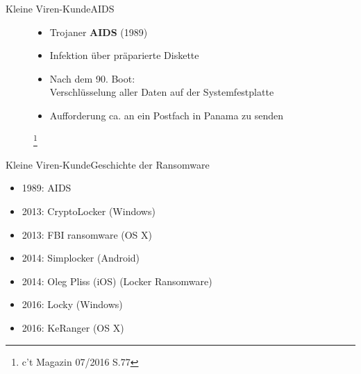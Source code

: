 \documentclass[notes,10pt]{beamer}
\begin{document}
\begin{frame}{Kleine Viren-Kunde}{AIDS}
	\begin{figure}[p]
		\begin{itemize}
			\item Trojaner \textbf{AIDS} (1989)
			\item Infektion über präparierte Diskette
			\item Nach dem 90. Boot: \\ Verschlüsselung aller Daten auf der Systemfestplatte
			\item Aufforderung ca.  an ein Postfach in Panama zu senden
		\end{itemize}
		\let\thefootnote\relax\footnote{c't Magazin 07/2016 S.77}
	\end{figure}
\end{frame}

\begin{frame}{Kleine Viren-Kunde}{Geschichte der Ransomware}
	\begin{itemize}
		\item<1-> 1989: AIDS
		\item<2-> 2013: CryptoLocker (Windows)
		\item<3-> 2013: FBI ransomware (OS X)
		\item<4-> 2014: Simplocker (Android)
		\item<4-> 2014: Oleg Pliss (iOS) (Locker Ransomware)
		\item<5-> 2016: Locky (Windows)
		\item<5-> 2016: KeRanger (OS X)
	\end{itemize}
\end{frame}
\end{document}
